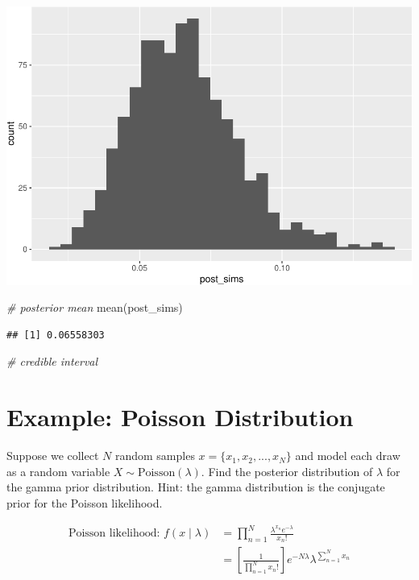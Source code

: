 \documentclass[
]{book}
\newenvironment{Shaded}{\begin{snugshade}}{\end{snugshade}}
\newcommand{\CommentTok}[1]{\textcolor[rgb]{0.56,0.35,0.01}{\textit{#1}}}
\newcommand{\FunctionTok}[1]{\textcolor[rgb]{0.00,0.00,0.00}{#1}}
\newcommand{\NormalTok}[1]{#1}
\begin{document}
\includegraphics{02-01-bayes_files/figure-latex/unnamed-chunk-6-1.pdf}

\begin{Shaded}
\begin{Highlighting}[]
\CommentTok{\# posterior mean}
\FunctionTok{mean}\NormalTok{(post\_sims)}
\end{Highlighting}
\end{Shaded}

\begin{verbatim}
## [1] 0.06558303
\end{verbatim}

\begin{Shaded}
\begin{Highlighting}[]
\CommentTok{\# credible interval}
\end{Highlighting}
\end{Shaded}

\hypertarget{example-poisson-distribution-3}{%
\section{Example: Poisson
Distribution}\label{example-poisson-distribution-3}}

Suppose we collect \(N\) random samples \(x = \{x_1, x_2, ..., x_N\}\)
and model each draw as a random variable
\(X \sim \text{Poisson}(\lambda)\). Find the posterior distribution of
\(\lambda\) for the gamma prior distribution. Hint: the gamma
distribution is the conjugate prior for the Poisson likelihood.

\[
\begin{aligned}
\text{Poisson likelihood: } f(x \mid \lambda) &= \prod_{n = 1}^N \frac{\lambda^{x_n} e^{-\lambda}}{x_n!} \\
&= \displaystyle \left[ \frac{1}{\prod_{n = 1}^N x_n !} \right]e^{-N\lambda}\lambda^{\sum_{n = 1}^N x_n}
\end{aligned}
\]
\end{document}
